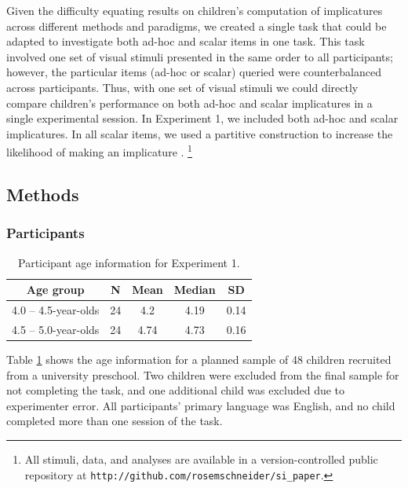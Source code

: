 \documentclass[man]{apa2}
\begin{document}
Given the difficulty equating results on children's computation of implicatures across different methods and paradigms, we created a single task that could be adapted to investigate both ad-hoc and scalar items in one task. This task involved one set of visual stimuli presented in the same order to all participants; however, the particular items (ad-hoc or scalar) queried were counterbalanced across participants. Thus, with one set of visual stimuli we could directly compare children's performance on both ad-hoc and scalar implicatures in a single experimental session. In Experiment 1, we included both ad-hoc and scalar implicatures. In all scalar items, we used a partitive construction to increase the likelihood of making an implicature \cite{degen2015}. \footnote{All stimuli, data, and analyses are available in a version-controlled public repository at \small{\tt{http://github.com/rosemschneider/si\_paper}}.}


\subsection{Methods}

\subsubsection{Participants}

\begin{table}[tb]
\centering
\begin{tabular}{ccccc}
\hline
{\bf Age group} & {\bf N} & {\bf Mean} & {\bf Median} & {\bf SD} \\
\hline
4.0 -- 4.5-year-olds & 24 & 4.2 & 4.19 & 0.14 \\
4.5 -- 5.0-year-olds & 24 & 4.74 & 4.73 & 0.16\\
\hline
\end{tabular}
\caption{\label{tab:exp_1_demo}Participant age information for Experiment 1.}
\end{table}

Table \ref{tab:exp_1_demo}  shows the age information for a planned sample of 48 children recruited from a university preschool. Two children were excluded from the final sample for not completing the task, and one additional child was excluded due to experimenter error. All participants' primary language was English, and no child completed more than one session of the task.
\end{document}

